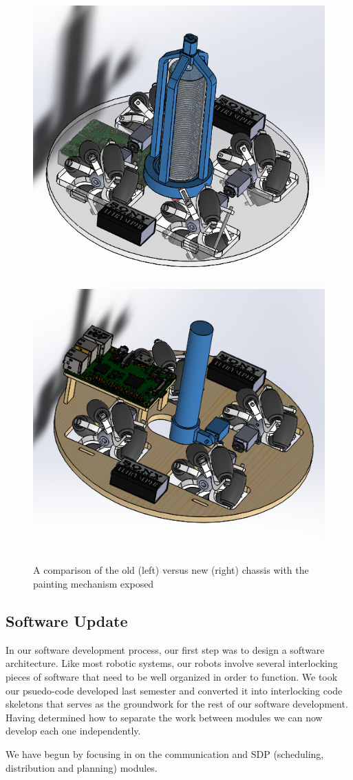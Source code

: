 \begin{figure}[h!]
\centering
\includegraphics[width=0.49\columnwidth]{CAD/old_painting_highlighted.PNG}
\includegraphics[width=0.49\columnwidth]{CAD/new_painting_highlighted.PNG}
\label{fig:em3}
\caption{A comparison of the old (left) versus new (right) chassis with the painting mechanism exposed}
\end{figure}

\clearpage

\subsection{Software Update}
\label{sec:software_progress}

In our software development process, our first step was to design a software architecture. Like most robotic systems, our robots involve several interlocking pieces of software that need to be well organized in order to function. We took our psuedo-code developed last semester and converted it into interlocking code skeletons that serves as the groundwork for the rest of our software development. Having determined how to separate the work between modules we can now develop each one independently.

We have begun by focusing in on the communication and SDP (scheduling, distribution and planning) modules.


